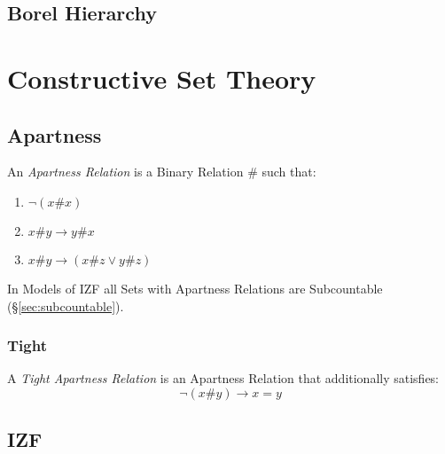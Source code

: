 \subsection{Borel Hierarchy}\label{sec:borel_hierarchy}



\section{Constructive Set Theory}\label{sec:constructive_set_theory}

\subsection{Apartness}\label{sec:apartness}

An \emph{Apartness Relation} is a Binary Relation $\#$ such that:

\begin{enumerate}
\item $\neg (x\#x)$
\item $x\#y \rightarrow y\#x$
\item $x\#y \rightarrow (x\#z \vee y\#z)$
\end{enumerate}

In Models of IZF all Sets with Apartness Relations are Subcountable
(\S\ref{sec:subcountable}).



\subsubsection{Tight}\label{sec:tight}

A \emph{Tight Apartness Relation} is an Apartness Relation that
additionally satisfies:
\[
  \neg (x \# y) \rightarrow x = y
\]



\subsection{IZF}\label{sec:izf}

